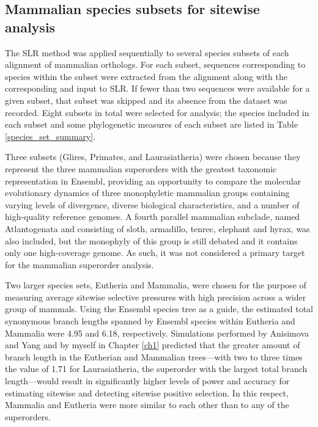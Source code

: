 \subsection{Mammalian species subsets for sitewise analysis}

The SLR method was applied sequentially to several species subsets of
each alignment of mammalian orthologs. For each subset, sequences
corresponding to species within the subset were extracted from the
alignment along with the corresponding \subtr and input to SLR. If
fewer than two sequences were available for a given subset, that
subset was skipped and its absence from the dataset was
recorded. Eight subsets in total were selected for analysis; the
species included in each subset and some phylogenetic measures of each
subset are listed in Table \ref{species_set_summary}.

Three subsets (Glires, Primates, and Laurasiatheria) were chosen
because they represent the three mammalian superorders with the
greatest taxonomic representation in Ensembl, providing an opportunity
to compare the molecular evolutionary dynamics of three monophyletic
mammalian groups containing varying levels of divergence, diverse
biological characteristics, and a number of high-quality reference
genomes. A fourth parallel mammalian subclade, named Atlantogenata and
consisting of sloth, armadillo, tenrec, elephant and hyrax, was also
included, but the monophyly of this group is still debated
\citep{TODO, Murphy et al. 2007 Gen Res; Churakov et al. 2009 Gen Res}
and it contains only one high-coverage genome. As such, it was not
considered a primary target for the mammalian superorder analysis.

Two larger species sets, Eutheria and Mammalia, were chosen for the
purpose of measuring average sitewise selective pressures with high
precision across a wider group of mammals. Using the Ensembl species
tree as a guide, the estimated total synonymous branch lengths spanned
by Ensembl species within Eutheria and Mammalia were 4.95 and 6.18,
respectively. Simulations performed by Anisimova and Yang
\citeyearpar{todo, Anisimova Yang 2002} and by myself in Chapter
\ref{ch1} predicted that the greater amount of branch length in the
Eutherian and Mammalian trees---with two to three times the value of
1.71 for Laurasiatheria, the superorder with the largest total branch
length---would result in significantly higher levels of power and
accuracy for estimating sitewise \omg and detecting sitewise positive
selection. In this respect, Mammalia and Eutheria were more similar to
each other than to any of the superorders.

